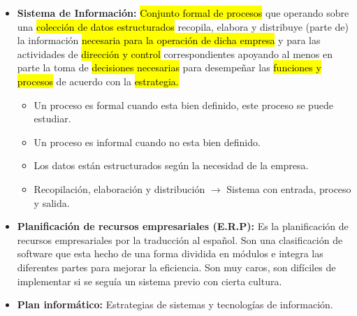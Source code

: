 \documentclass{templateNote}
\begin{document}
\begin{itemize}
    \item \textbf{Sistema de Información:} \hl{Conjunto formal de procesos} que operando sobre una \hl{colección de datos estructurados} recopila, elabora y distribuye (parte de) la información \hl{necesaria para la operación de dicha empresa} y para las actividades de \hl{dirección y control} correspondientes apoyando al menos en parte la toma de \hl{decisiones necesarias} para desempeñar las \hl{funciones y procesos} de acuerdo con la \hl{estrategia.}
    \begin{itemize}
        \item Un proceso es formal cuando esta bien definido, este proceso se puede estudiar.
        \item Un proceso es informal cuando no esta bien definido.
        \item Los datos están estructurados según la necesidad de la empresa.
        \item Recopilación, elaboración y distribución $\rightarrow$ Sistema con entrada, proceso y salida.
    \end{itemize}

    \item \textbf{Planificación de recursos empresariales (E.R.P):} Es la planificación de recursos empresariales por la traducción al español. Son una clasificación de software que esta hecho de una forma dividida en módulos e integra las diferentes partes para mejorar la eficiencia. Son muy caros, son difíciles de implementar si se seguía un sistema previo con cierta cultura.

    \item \textbf{Plan informático:} Estrategias de sistemas y tecnologías de información.
\end{itemize}
\end{document}
